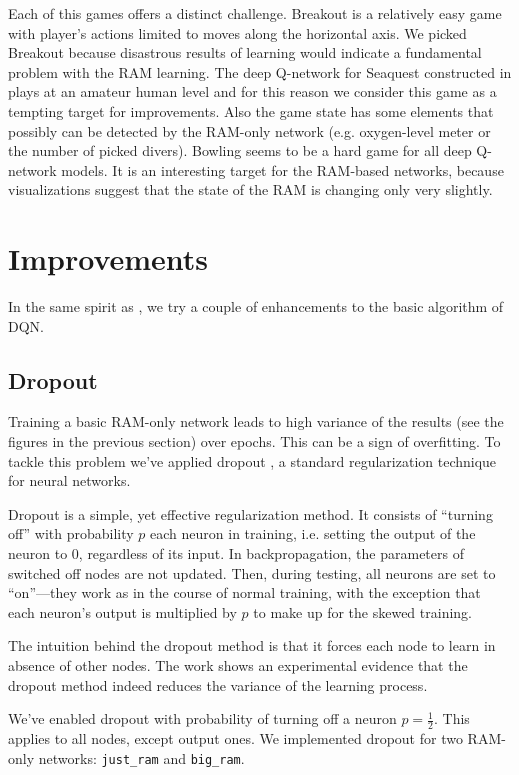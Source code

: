 Each of this games offers a distinct challenge. Breakout is a relatively easy game with player's actions limited to moves along the horizontal axis. We picked Breakout because disastrous results of learning would indicate a fundamental problem with the RAM learning. The deep Q-network for Seaquest constructed in \cite{mnih-dqn} plays at an amateur human level and for this reason we consider this game as a tempting target for improvements. Also the game state has some elements that possibly can be detected by the RAM-only network (e.g. oxygen-level meter or the number of picked divers). Bowling seems to be a hard game for all deep Q-network models. It is an interesting target for the RAM-based networks, because visualizations suggest that the state of the RAM is changing only very slightly.

\section{Improvements}
In the same spirit as \cite{mnih-dqn}, we try a couple of enhancements to the basic algorithm of DQN.

\subsection{Dropout}
Training a basic RAM-only network leads to high variance of the results (see the figures in the previous section) over epochs. This can be a sign of overfitting. To tackle this problem we’ve applied dropout \cite{dropout}, a standard regularization technique for neural networks.

Dropout is a simple, yet effective regularization method. It consists of ``turning off'' with probability $p$ each neuron in training, i.e. setting the output of the neuron to $0$, regardless of its input. In backpropagation, the parameters of switched off nodes are not updated. Then, during testing, all neurons are set to ``on''---they work as in the course of normal training, with the exception that each neuron's output is multiplied by $p$ to make up for the skewed training.

The intuition behind the dropout method is that it forces each node to learn in absence of other nodes. The work \cite{dropout-variance} shows an experimental evidence that the dropout method indeed reduces the variance of the learning process.

We've enabled dropout with probability of turning off a neuron $p = \frac{1}{2}$. This applies to all nodes, except output ones. We implemented dropout for two RAM-only networks: \texttt{just\_ram} and \texttt{big\_ram}.

